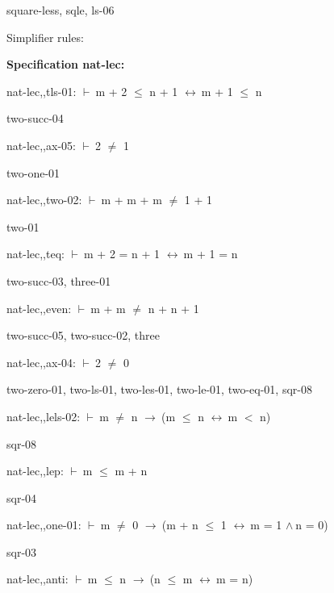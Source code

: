 \documentclass[a4paper]{article}
\newcommand{\Fol}{\mbox{$\vdash\ $}}
\newcommand{\And}{\mbox{$\wedge\ $}}
\newcommand{\Imp}{\mbox{$\rightarrow\ $}}
\newcommand{\Equiv}{\mbox{$\leftrightarrow\ $}}
\begin{document}
square-less, sqle, ls-06

\bigskip




Simplifier rules: 


{\bf Specification nat-lec:}

nat-lec,,tls-01: 
 \Fol m + 2 $\le$ n + 1 \Equiv m + 1 $\le$ n



two-succ-04

\bigskip

nat-lec,,ax-05: 
 \Fol 2 $\neq$ 1



two-one-01

\bigskip

nat-lec,,two-02: 
 \Fol m + m + m $\neq$ 1 + 1



two-01

\bigskip

nat-lec,,teq: 
 \Fol m + 2 = n + 1 \Equiv m + 1 = n



two-succ-03, three-01

\bigskip

nat-lec,,even: 
 \Fol m + m $\neq$ n + n + 1



two-succ-05, two-succ-02, three

\bigskip

nat-lec,,ax-04: 
 \Fol 2 $\neq$ 0



two-zero-01, two-ls-01, two-les-01, two-le-01, two-eq-01, sqr-08

\bigskip

nat-lec,,lels-02: 
 \Fol m $\neq$ n \Imp (m $\le$ n \Equiv m $<$ n)



sqr-08

\bigskip

nat-lec,,lep: 
 \Fol m $\le$ m + n



sqr-04

\bigskip

nat-lec,,one-01: 
 \Fol m $\neq$ 0 \Imp (m + n $\le$ 1 \Equiv m = 1 \And n = 0)



sqr-03

\bigskip

nat-lec,,anti: 
 \Fol m $\le$ n \Imp (n $\le$ m \Equiv m = n)
\end{document}
